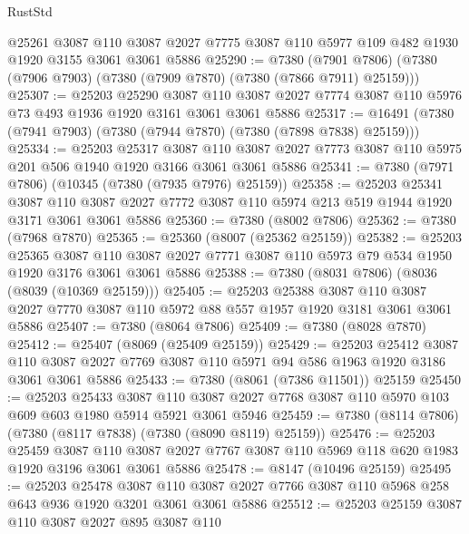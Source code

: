 \begin{lexlean}{RustStd}
\begin{coremodule}
    @25261
    @3087
    @110
    @3087
    @2027
    @7775
    @3087
    @110
    @5977
    @109
    @482
    @1930
    @1920
    @3155
    @3061
    @3061
    @5886
@25290 := @7380
    (@7901 @7806)
    (@7380 (@7906 @7903) (@7380 (@7909 @7870) (@7380 (@7866 @7911) @25159)))
@25307 := @25203
    @25290
    @3087
    @110
    @3087
    @2027
    @7774
    @3087
    @110
    @5976
    @73
    @493
    @1936
    @1920
    @3161
    @3061
    @3061
    @5886
@25317 := @16491 (@7380 (@7941 @7903) (@7380 (@7944 @7870) (@7380 (@7898 @7838) @25159)))
@25334 := @25203
    @25317
    @3087
    @110
    @3087
    @2027
    @7773
    @3087
    @110
    @5975
    @201
    @506
    @1940
    @1920
    @3166
    @3061
    @3061
    @5886
@25341 := @7380 (@7971 @7806) (@10345 (@7380 (@7935 @7976) @25159))
@25358 := @25203
    @25341
    @3087
    @110
    @3087
    @2027
    @7772
    @3087
    @110
    @5974
    @213
    @519
    @1944
    @1920
    @3171
    @3061
    @3061
    @5886
@25360 := @7380 (@8002 @7806)
@25362 := @7380 (@7968 @7870)
@25365 := @25360 (@8007 (@25362 @25159))
@25382 := @25203
    @25365
    @3087
    @110
    @3087
    @2027
    @7771
    @3087
    @110
    @5973
    @79
    @534
    @1950
    @1920
    @3176
    @3061
    @3061
    @5886
@25388 := @7380 (@8031 @7806) (@8036 (@8039 (@10369 @25159)))
@25405 := @25203
    @25388
    @3087
    @110
    @3087
    @2027
    @7770
    @3087
    @110
    @5972
    @88
    @557
    @1957
    @1920
    @3181
    @3061
    @3061
    @5886
@25407 := @7380 (@8064 @7806)
@25409 := @7380 (@8028 @7870)
@25412 := @25407 (@8069 (@25409 @25159))
@25429 := @25203
    @25412
    @3087
    @110
    @3087
    @2027
    @7769
    @3087
    @110
    @5971
    @94
    @586
    @1963
    @1920
    @3186
    @3061
    @3061
    @5886
@25433 := @7380 (@8061 (@7386 @11501)) @25159
@25450 := @25203
    @25433
    @3087
    @110
    @3087
    @2027
    @7768
    @3087
    @110
    @5970
    @103
    @609
    @603
    @1980
    @5914
    @5921
    @3061
    @5946
@25459 := @7380 (@8114 @7806) (@7380 (@8117 @7838) (@7380 (@8090 @8119) @25159))
@25476 := @25203
    @25459
    @3087
    @110
    @3087
    @2027
    @7767
    @3087
    @110
    @5969
    @118
    @620
    @1983
    @1920
    @3196
    @3061
    @3061
    @5886
@25478 := @8147 (@10496 @25159)
@25495 := @25203
    @25478
    @3087
    @110
    @3087
    @2027
    @7766
    @3087
    @110
    @5968
    @258
    @643
    @936
    @1920
    @3201
    @3061
    @3061
    @5886
@25512 := @25203
    @25159
    @3087
    @110
    @3087
    @2027
    @895
    @3087
    @110

\end{coremodule}
\end{lexlean}
